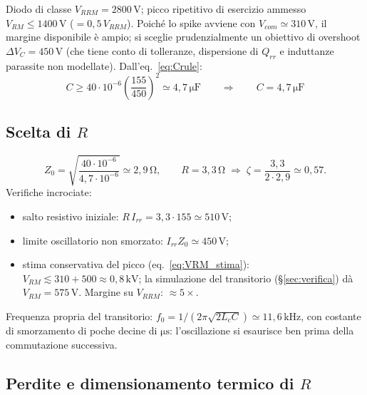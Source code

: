 \documentclass[11pt,a4paper]{article}
\newcommand{\unit}[1]{\,\mathrm{#1}}
\begin{document}
Diodo di classe $V_{RRM}=2800\unit{V}$; picco ripetitivo di esercizio
ammesso $V_{RM} \le 1400\unit{V}$ ($=0{,}5\,V_{RRM}$). Poich\'e lo spike
avviene con $V_{com}\simeq310\unit{V}$, il margine disponibile \`e ampio;
si sceglie prudenzialmente un obiettivo di overshoot
$\Delta V_C = 450\unit{V}$ (che tiene conto di tolleranze, dispersione di
$Q_{rr}$ e induttanze parassite non modellate). Dall'eq.~\eqref{eq:Crule}:
\begin{equation}
C \ge 40\cdot10^{-6}\left(\frac{155}{450}\right)^{\!2} \simeq 4{,}7\unit{\mu F}
\qquad\Rightarrow\qquad \boxed{C = 4{,}7\unit{\mu F}}
\end{equation}

\subsection{Scelta di $R$}

\begin{equation}
Z_0 = \sqrt{\frac{40\cdot10^{-6}}{4{,}7\cdot10^{-6}}} \simeq 2{,}9\unit{\Omega},
\qquad
R = 3{,}3\unit{\Omega} \;\Rightarrow\; \zeta = \frac{3{,}3}{2\cdot2{,}9}\simeq 0{,}57.
\end{equation}
Verifiche incrociate:
\begin{itemize}
\item salto resistivo iniziale: $R\,I_{rr} = 3{,}3\cdot155 \simeq 510\unit{V}$;
\item limite oscillatorio non smorzato: $I_{rr}Z_0 \simeq 450\unit{V}$;
\item stima conservativa del picco (eq.~\ref{eq:VRM_stima}):
$V_{RM} \lesssim 310 + 500 \approx 0{,}8\unit{kV}$; la simulazione del
transitorio (\S\ref{sec:verifica}) d\`a $V_{RM} = 575\unit{V}$.
Margine su $V_{RRM}$: $\approx 5\times$.
\end{itemize}
Frequenza propria del transitorio:
$f_0 = 1/(2\pi\sqrt{2L_c C}) \simeq 11{,}6\unit{kHz}$, con costante di
smorzamento di poche decine di $\mathrm{\mu s}$: l'oscillazione si
esaurisce ben prima della commutazione successiva.

\subsection{Perdite e dimensionamento termico di $R$}
\end{document}
